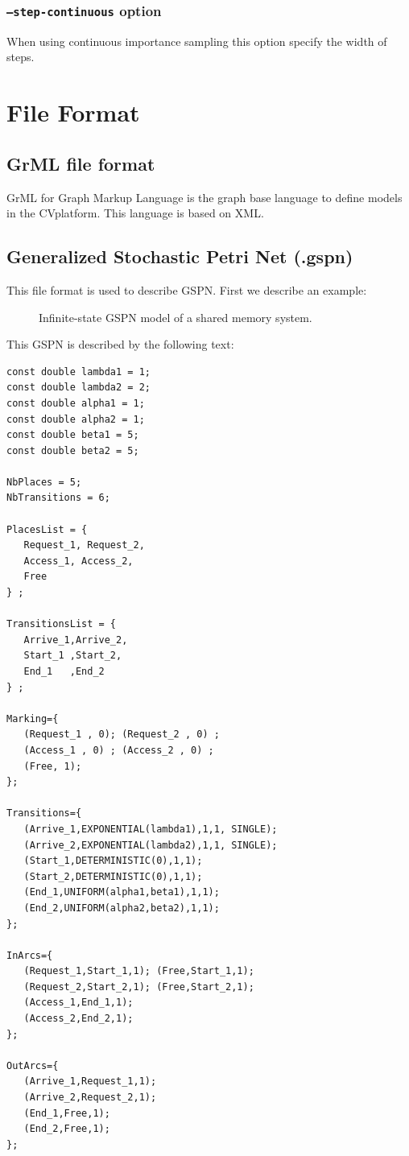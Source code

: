\documentclass{article}
\newcommand{\cosyverif}{\mbox{\textup{C}\scalebox{0.75}{{\textsc{OSY}}}\textup{V}\scalebox{0.75}{{\textsc{ERIF}}}}}
\begin{document}
\subsubsection{\texttt{--step-continuous} option}
When using continuous importance sampling this option specify the width
of steps.


\section{File Format}
\label{sec:fileformat}

\subsection{GrML file format}
GrML for Graph Markup Language is the graph base language to define
models in the \cosyverif platform. This language is based on XML.


\subsection{Generalized Stochastic Petri Net (.gspn)}
This file format is used to describe GSPN.
First we describe an example:\\
\begin{figure}[h]
  \centering
  
  \caption{Infinite-state GSPN  model of a shared memory system.}
  \label{fig:sharedmem}
\end{figure}
This GSPN is described by the following text:

\begin{scriptsize}
\begin{verbatim}
const double lambda1 = 1;
const double lambda2 = 2;
const double alpha1 = 1;
const double alpha2 = 1;
const double beta1 = 5;
const double beta2 = 5;

NbPlaces = 5;
NbTransitions = 6;

PlacesList = { 
   Request_1, Request_2,
   Access_1, Access_2,
   Free
} ;

TransitionsList = { 
   Arrive_1,Arrive_2,
   Start_1 ,Start_2,
   End_1   ,End_2
} ;

Marking={
   (Request_1 , 0); (Request_2 , 0) ; 
   (Access_1 , 0) ; (Access_2 , 0) ;
   (Free, 1);
};

Transitions={
   (Arrive_1,EXPONENTIAL(lambda1),1,1, SINGLE); 
   (Arrive_2,EXPONENTIAL(lambda2),1,1, SINGLE);
   (Start_1,DETERMINISTIC(0),1,1); 
   (Start_2,DETERMINISTIC(0),1,1);
   (End_1,UNIFORM(alpha1,beta1),1,1); 
   (End_2,UNIFORM(alpha2,beta2),1,1);
};

InArcs={
   (Request_1,Start_1,1); (Free,Start_1,1);
   (Request_2,Start_2,1); (Free,Start_2,1);
   (Access_1,End_1,1);
   (Access_2,End_2,1);
};

OutArcs={
   (Arrive_1,Request_1,1); 
   (Arrive_2,Request_2,1);
   (End_1,Free,1);
   (End_2,Free,1);
};
\end{verbatim}
\end{scriptsize}
\end{document}
